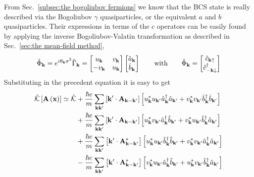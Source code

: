 From Sec.~\ref{subsec:the bogoliubov fermions} we know that the BCS state is really described via the Bogoliubov $\gamma$ quasiparticles, or the equivalent $a$ and $b$ quasiparticles. Their expressions in terms of the $c$ operators can be easily found by applying the inverse Bogoliubov-Valatin transformation as described in Sec.~\ref{sec:the mean-field method},
\[
	\hat{\Phi}_\mathbf{k} = e^{i\theta_\mathbf{k} \sigma^2} \hat{\Gamma}_\mathbf{k} = \begin{bmatrix}
		u_\mathbf{k} & v_\mathbf{k} \\
		- v_\mathbf{k} & u_\mathbf{k}
	\end{bmatrix} \begin{bmatrix}
		\hat{a}_\mathbf{k} \\ \hat{b}_\mathbf{k}
	\end{bmatrix}
	\quad\qq{with}\quad
	\hat{\Phi}_\mathbf{k} = \begin{bmatrix}
		\hat{c}_{\mathbf{k}\uparrow} \\ \hat{c}_{-\mathbf{k}\downarrow}^\dagger
	\end{bmatrix}
\]
Substituting in the precedent equation it is easy to get
\[
\begin{aligned}
	\hat{\mathcal{K}} \left[{\mathbf{A}\left({\mathbf{x}}\right)}\right] \simeq \hat{\mathcal{K}} &+ \frac{\hbar e}{m} \sum_{\mathbf{k} \mathbf{k}'} \left[{\mathbf{k}' \cdot \mathbf{A}_{\mathbf{k}-\mathbf{k}'} }\right] \left[{
		u_\mathbf{k}^* u_{\mathbf{k}'} \hat{a}_\mathbf{k}^\dagger \hat{a}_{\mathbf{k}'} + v_\mathbf{k}^* v_{\mathbf{k}'} \hat{b}_\mathbf{k}^\dagger \hat{b}_{\mathbf{k}'}
	}\right]\\
	&+ \frac{\hbar e}{m} \sum_{\mathbf{k} \mathbf{k}'} \left[{\mathbf{k}' \cdot \mathbf{A}_{\mathbf{k}-\mathbf{k}'} }\right] \left[{
		u_\mathbf{k}^* v_{\mathbf{k}'} \hat{a}_\mathbf{k}^\dagger \hat{b}_{\mathbf{k}'} + v_\mathbf{k}^* u_{\mathbf{k}'} \hat{b}_\mathbf{k}^\dagger \hat{a}_{\mathbf{k}'}
	}\right]\\
	&+ \frac{\hbar e}{m} \sum_{\mathbf{k} \mathbf{k}'} \left[{\mathbf{k}' \cdot \mathbf{A}_{\mathbf{k}-\mathbf{k}'}^* }\right] \left[{
		u_\mathbf{k}^* u_{\mathbf{k}'} \hat{b}_\mathbf{k}^\dagger \hat{b}_{\mathbf{k}'} + v_\mathbf{k}^* v_{\mathbf{k}'} \hat{a}_\mathbf{k}^\dagger \hat{a}_{\mathbf{k}'}
	}\right]\\
	&- \frac{\hbar e}{m} \sum_{\mathbf{k} \mathbf{k}'} \left[{\mathbf{k}' \cdot \mathbf{A}_{\mathbf{k}-\mathbf{k}'}^* }\right] \left[{
		v_\mathbf{k}^* u_{\mathbf{k}'} \hat{a}_\mathbf{k}^\dagger \hat{b}_{\mathbf{k}'} + u_\mathbf{k}^* v_{\mathbf{k}'} \hat{b}_\mathbf{k}^\dagger \hat{a}_{\mathbf{k}'}
	}\right]
\end{aligned}
\]
